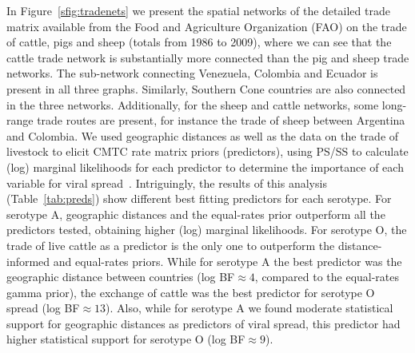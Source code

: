 \documentclass[10pt]{article}
\begin{document}
In Figure~\ref{sfig:tradenets} we present the spatial networks of the detailed trade matrix available from the Food and Agriculture Organization (FAO) on the trade of cattle, pigs and sheep (totals from 1986 to 2009), where we can see that the cattle trade network is substantially more connected than the pig and sheep trade networks.
The sub-network connecting Venezuela, Colombia and Ecuador is present in all three graphs.
Similarly, Southern Cone countries are also connected in the three networks.
Additionally, for the sheep and cattle networks, some long-range trade routes are present, for instance the trade of sheep between Argentina and Colombia.
We used geographic distances as well as the data on the trade of livestock to elicit CMTC rate matrix priors (predictors), using PS/SS to calculate (log) marginal likelihoods for each predictor to determine the importance of each variable for viral spread~\cite{Carvalho2013, Nelson2011}.
Intriguingly, the results of this analysis (Table~\ref{tab:preds}) show different best fitting predictors for each serotype.
For serotype A, geographic distances and the equal-rates prior outperform all the predictors tested, obtaining higher (log) marginal likelihoods.
For serotype O, the trade of live cattle as a predictor is the only one to outperform the distance-informed and equal-rates priors.
While for serotype A the best predictor was the geographic distance between countries (log BF$\approx 4$, compared to the equal-rates gamma prior), the exchange of cattle was the best predictor for serotype O spread (log BF$\approx 13$).
Also, while for serotype A we found moderate statistical support for geographic distances as predictors of viral spread, this predictor had higher statistical support for serotype O (log BF$\approx 9$).
\end{document}
